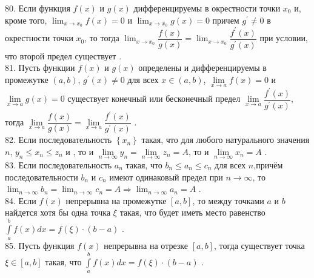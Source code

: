 \documentclass[12pt]{article}
\begin{document}
80. Если функция ${\displaystyle f(x)}$ и ${\displaystyle g(x)}$ дифференцируемы в окрестности точки ${\displaystyle x_0}$ и, кроме того, ${\displaystyle \lim _{x \to x_0} f(x)=0}$ и ${\displaystyle \lim _{x \to x_0} g(x)=0}$ причем ${\displaystyle g^{\prime}\neq 0}$ в окрестности точки ${\displaystyle x_0}$, то тогда ${\displaystyle \lim _{x \to x_0} \dfrac{f(x)}{g(x)}=\lim _{x \to x_0} \dfrac{f^{\prime}(x)}{g^{\prime}(x)}}$ при условии, что второй предел существует .\\

81. Пусть функции ${\displaystyle f(x)}$ и ${\displaystyle g(x)}$ определены и дифференцируемы в промежутке ${\displaystyle (a,b)}$, ${\displaystyle g^{\prime}(x) \neq 0}$ для всех ${\displaystyle x\in (a,b)}$, ${\displaystyle \lim \limits _{x \to a} f(x)=0}$ и ${\displaystyle \lim \limits _{x \to a} g(x)=0}$  существует конечный или бесконечный предел ${\displaystyle \lim \limits _{x \to a} \dfrac{f^{\prime}(x)}{g^{\prime}(x)}}$, тогда ${\displaystyle \lim \limits _{x \to a}\dfrac{f(x)}{g(x)}=\lim \limits _{x \to a} \dfrac{f^{\prime}(x)}{g^{\prime}(x)}}$ .\\

82. Если последовательность ${\displaystyle \left \{ x_{n} \right \}}$ такая, что для любого натурального значения ${\displaystyle n}$, ${\displaystyle y_{n} \leq x_{n} \leq z_{n}}$ и , то и ${\displaystyle \lim \limits _{n \to \infty} y_n=\lim \limits _{n \to \infty} z_n=A}$, то и ${\lim \limits _{n \to \infty} x_n=A}$ .\\

83. Если последовательность ${\displaystyle a_{n}}$ такая, что ${\displaystyle b_{n}\leqslant a_{n}\leqslant c_{n}}$ для всех ${\displaystyle n}$,причём последовательности ${\displaystyle b_{n}}$  и  ${\displaystyle c_{n}}$ имеют одинаковый предел при ${\displaystyle n\to \infty }$, то ${\displaystyle \lim _{n\to \infty }b_{n}=\lim _{n\to \infty }c_{n}=A\Rightarrow \lim _{n\to \infty }a_{n}=A }$ .\\

84. Если ${\displaystyle f(x)}$ непрерывна на промежутке ${\displaystyle [a,b]}$, то между точками ${\displaystyle a}$ и ${\displaystyle b}$ найдется хотя бы одна точка  ${\displaystyle \xi}$ такая, что будет иметь место равенство ${\displaystyle \int \limits _{a}^{b} f(x) dx=f(\xi)\cdot (b-a)}$ .\\

85. Пусть функция ${\displaystyle f(x)}$ непрерывна на отрезке ${\displaystyle [a,b]}$, тогда существует точка ${\displaystyle \xi \in [a,b]}$ такая, что ${\displaystyle \int \limits _{a}^{b} f(x) dx=f(\xi)\cdot (b-a)}$ .\\
\end{document}
